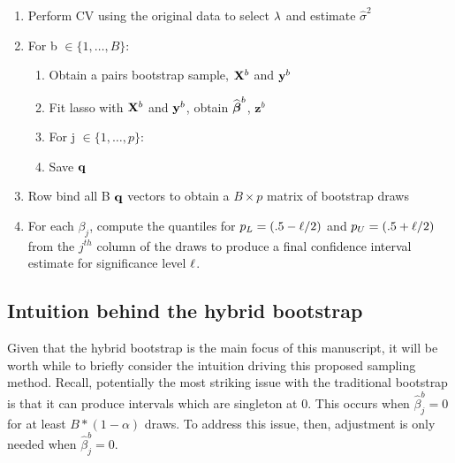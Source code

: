 \begin{enumerate}
\item Perform CV using the original data to select $\lambda$ and estimate $\hat{\sigma}^2$
\item For b $\in \lbrace 1, \ldots, B \rbrace$:
\begin{enumerate}
\item Obtain a pairs bootstrap sample, $\mathbf{X}^b$ and $\mathbf{y}^b$
\item Fit lasso with $\mathbf{X}^b$ and $\mathbf{y}^b$, obtain $\widehat{\boldsymbol{\beta}}^b$, $\boldsymbol{z}^b$
\item For j $\in \lbrace 1, \ldots, p \rbrace$:
	\begin{algorithmic}
    \EndCase
    \EndCase
    \EndCase
    \EndCase
	\EndSwitch 
	\end{algorithmic}
\item Save $\mathbf{q}$
\end{enumerate}
\item Row bind all B $\mathbf{q}$ vectors to obtain a $B \times p$ matrix of bootstrap draws
\item For each $\beta_j$, compute the quantiles for $p_L = (.5 - \ell/2)$ and $p_U = (.5 + \ell/2)$ from the $j^{th}$ column of the draws to produce a final confidence interval estimate for significance level $\ell$.
\end{enumerate}

\subsection{Intuition behind the hybrid bootstrap}

Given that the hybrid bootstrap is the main focus of this manuscript, it will be worth while to briefly consider the intuition driving this proposed sampling method. Recall, potentially the most striking issue with the traditional bootstrap is that it can produce intervals which are singleton at 0. This occurs when $\hat{\beta}_j^b = 0$ for at least $B * (1 - \alpha)$ draws. To address this issue, then, adjustment is only needed when $\hat{\beta}_j^{b} = 0$. 


